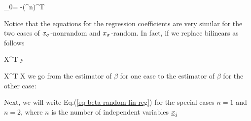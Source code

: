 \beq
{}
\label{eq-beta-random-lin-reg}
\eeq

\beq
\beta_0=
\av{\rvy}-(\beta^n)^T 
\eeq

Notice that 
the equations for the regression coefficients
are very similar
for the two cases of $x_\sigma$-nonrandom
and $x_\sigma$-random.
In fact, if  we replace bilinears as follows

\beq
X^T y\longrightarrow{} 
\eeq

\beq
X^T X
\longrightarrow {}
\eeq
we go from the estimator  
of $\beta$ for one case
to the estimator 
of $\beta$ for the other case:

\beq
{}
\longrightarrow
{}
\eeq

Next, we will
write 
 Eq.(\ref{eq-beta-random-lin-reg})
for the special cases
$n=1$ and $n=2$,
where $n$ is the 
number of independent 
variables ${\underline{x}}_j$

